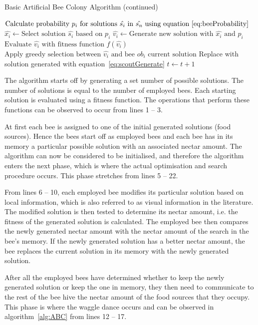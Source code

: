 \begin{algorithm}
	\caption{Basic Artificial Bee Colony Algorithm (continued)}
	\label{alg:ABC1}
	\begin{algorithmic}[1]
    \State$\text{Calculate probability $p_i$ for solutions $\hat{s_i}$ in $\hat{s_n}$ using equation~\ref{eq:beeProbability}}$
				\State$\hat{x_i} \leftarrow \text{Select solution $\hat{s_i}$ based on $p_i$} $
				\State$\hat{v_i} \leftarrow \text{Generate new solution with $\hat{x_i}$ and $p_i$}$
				\State$\text{Evaluate $\hat{v_i}$ with fitness function $f(\hat{v_i})$}$
				\State$\text{Apply greedy selection between $\hat{v_i}$ and bee $ob_i$ current solution}$
			\EndFor
				\State Replace with solution generated with equation~\ref{eq:scoutGenerate}
			\EndIf
			\State$t \leftarrow t + 1$
		\EndWhile
	\end{algorithmic}
\end{algorithm}
The algorithm starts off by generating a set number of possible solutions. The number of solutions is equal to the number of employed bees. Each starting solution is evaluated using a fitness function. The operations that perform these functions can be observed to occur from lines 1 -- 3.

At first each bee is assigned to one of the initial generated solutions (food sources). Hence the bees start off as employed bees and each bee has in its memory a particular possible solution with an associated nectar amount. The algorithm can now be considered to be initialised, and therefore the algorithm enters the next phase, which is where the actual optimisation and search procedure occurs. This phase stretches from lines 5 -- 22.

From lines 6 -- 10, each employed bee modifies its particular solution based on local information, which is also referred to as visual information in the literature. The modified solution is then tested to determine its nectar amount, i.e. the fitness of the generated solution is calculated. The employed bee then compares the newly generated nectar amount with the nectar amount of the search in the bee's memory. If the newly generated solution has a better nectar amount, the bee replaces the current solution in its memory with the newly generated solution.

After all the employed bees have determined whether to keep the newly generated solution or keep the one in memory, they then need to communicate to the rest of the bee hive the nectar amount of the food sources that they occupy. This phase is where the waggle dance occurs and can be observed in algorithm~\ref{alg:ABC} from lines 12 -- 17.

